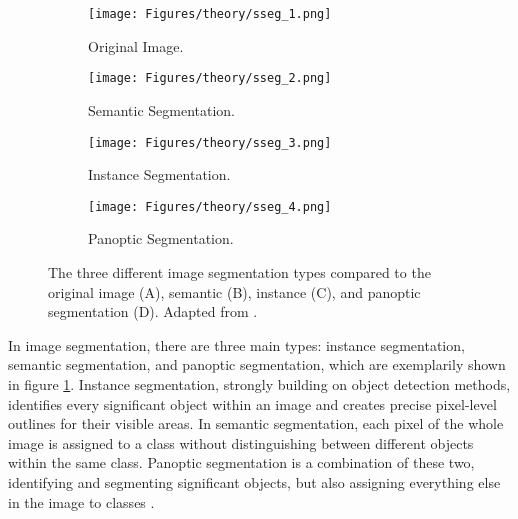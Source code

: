 \begin{figure}[htb]
    \centering
    \begin{subfigure}{0.24\textwidth}
        \centering
        \texttt{[image: Figures/theory/sseg\_1.png]}
        \caption{Original Image.}
    \end{subfigure}
    \begin{subfigure}{0.24\textwidth}
        \centering
        \texttt{[image: Figures/theory/sseg\_2.png]}
        \caption{Semantic Segmentation.}
    \end{subfigure}
    \begin{subfigure}{0.24\textwidth}
        \centering
        \texttt{[image: Figures/theory/sseg\_3.png]}
        \caption{Instance Segmentation.}
    \end{subfigure}
    \begin{subfigure}{0.24\textwidth}
        \centering
        \texttt{[image: Figures/theory/sseg\_4.png]}
        \caption{Panoptic Segmentation.}
    \end{subfigure}
    \caption[Types of Image Segmentation]{The three different image segmentation types compared to the original image (A), semantic (B), instance (C), and panoptic segmentation (D). Adapted from \textcite{Kirillov.He.ea2019,Szeliski2022}.}
    \label{fig:segmentation}
\end{figure}

In image segmentation, there are three main types: instance segmentation, semantic segmentation, and panoptic segmentation, which are exemplarily shown in figure \ref{fig:segmentation}. Instance segmentation, strongly building on object detection methods, identifies every significant object within an image and creates precise pixel-level outlines for their visible areas. In semantic segmentation, each pixel of the whole image is assigned to a class without distinguishing between different objects within the same class. Panoptic segmentation is a combination of these two, identifying and segmenting significant objects, but also assigning everything else in the image to classes \autocite{Li.Cai.ea2024,Minaee.Boykov.ea2022,Szeliski2022}.

